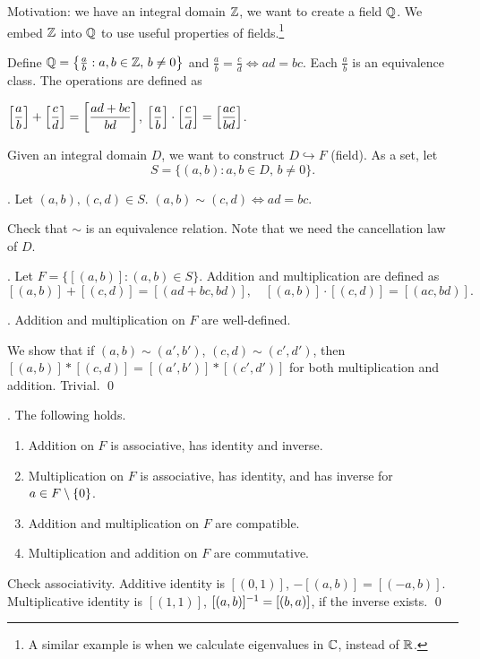 
Motivation: we have an integral domain \(\mathbb{Z}\), we want to create a field \(\mathbb{Q}\). We embed \(\mathbb{Z}\) into \(\mathbb{Q}\) to use useful properties of fields.\footnote{A similar example is when we calculate eigenvalues in \(\mathbb{C}\), instead of \(\mathbb{R}\).}

Define \(\mathbb{Q} = \left\{\frac{a}{b} : a, b \in \mathbb{Z},\, b \neq 0\right\}\) and \(\frac{a}{b} = \frac{c}{d} \iff ad = bc\). Each \(\frac{a}{b}\) is an equivalence class. The operations are defined as
\begin{center}
    \(\displaystyle \left[\frac{a}{b}\right] + \left[\frac{c}{d}\right] = \left[\frac{ad + bc}{bd}\right]\), \(\displaystyle \left[\frac{a}{b}\right] \cdot \left[\frac{c}{d}\right] = \left[\frac{ac}{bd}\right]\).
\end{center}

Given an integral domain \(D\), we want to construct \(D \hookrightarrow F\) (field). As a set, let
\[
    S = \{(a, b) : a, b\in D,\, b \neq 0\}.
\]

. Let \((a, b), (c, d) \in S\). \((a, b) \sim (c, d) \iff ad = bc\).

Check that \(\sim\) is an equivalence relation. Note that we need the cancellation law of \(D\).

. Let \(F = \{[(a, b)] : (a, b) \in S\}\). Addition and multiplication are defined as
\[
    [(a, b)] + [(c, d)] = [(ad + bc, bd)], \quad [(a, b)] \cdot [(c, d)] = [(ac, bd)].
\]

\lemma. Addition and multiplication on \(F\) are well-defined.

\pf We show that if \((a, b) \sim (a', b')\), \((c, d) \sim (c', d')\), then \([(a, b)] * [(c, d)] = [(a', b')] * [(c', d')]\) for both multiplication and addition. Trivial. \qed

\lemma. The following holds.
\begin{enumerate}
    \item Addition on \(F\) is associative, has identity and inverse.
    \item Multiplication on \(F\) is associative, has identity, and has inverse for \(a \in F \setminus \{0\}\).
    \item Addition and multiplication on \(F\) are compatible.
    \item Multiplication and addition on \(F\) are commutative.
\end{enumerate}

\pf Check associativity. Additive identity is \([(0, 1)]\), \(-[(a, b)] = [(-a, b)]\). Multiplicative identity is \([(1, 1)]\), \([(a, b)]^{-1} = [(b, a)]\), if the inverse exists. \qed

